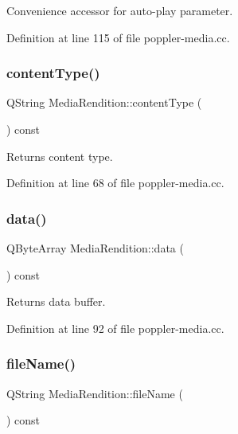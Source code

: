 Convenience accessor for auto-\/play parameter. 

Definition at line 115 of file poppler-\/media.\+cc.

\mbox{\label{class_poppler_1_1_media_rendition_a7c426eb89375af3523d986404146fd44}} 
\subsubsection{\texorpdfstring{content\+Type()}{contentType()}}
{\footnotesize\ttfamily Q\+String Media\+Rendition\+::content\+Type (\begin{DoxyParamCaption}{ }\end{DoxyParamCaption}) const}

Returns content type. 

Definition at line 68 of file poppler-\/media.\+cc.

\mbox{\label{class_poppler_1_1_media_rendition_a0e75d17d368b01007cf2e8deaefe70e8}} 
\subsubsection{\texorpdfstring{data()}{data()}}
{\footnotesize\ttfamily Q\+Byte\+Array Media\+Rendition\+::data (\begin{DoxyParamCaption}{ }\end{DoxyParamCaption}) const}

Returns data buffer. 

Definition at line 92 of file poppler-\/media.\+cc.

\mbox{\label{class_poppler_1_1_media_rendition_ac926ac98e75a523f08aa1467c184a0d0}} 
\subsubsection{\texorpdfstring{file\+Name()}{fileName()}}
{\footnotesize\ttfamily Q\+String Media\+Rendition\+::file\+Name (\begin{DoxyParamCaption}{ }\end{DoxyParamCaption}) const}


